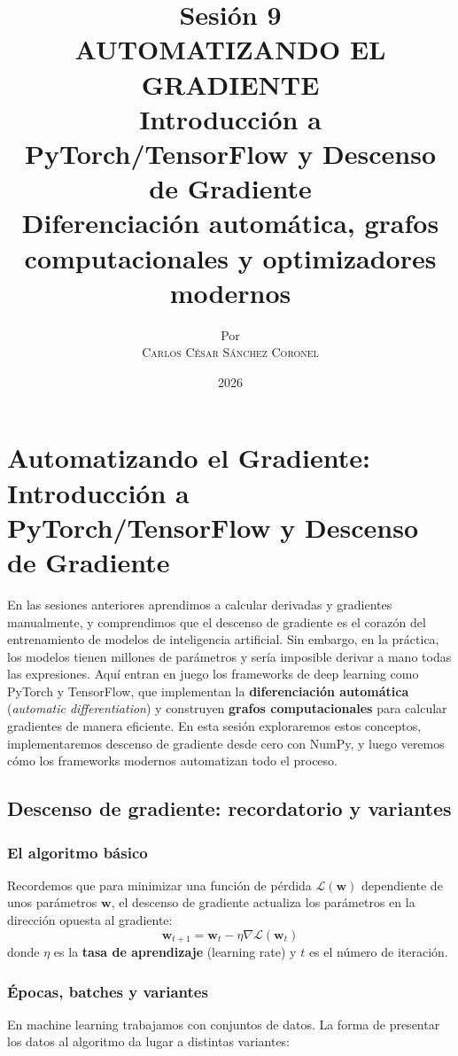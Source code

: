 \documentclass[12pt,a4paper,openany,oneside]{book}
\title{
    \textbf{Sesión 9} \\ 
    \Huge \textbf{AUTOMATIZANDO EL GRADIENTE} \\
    \large Introducción a PyTorch/TensorFlow y Descenso de Gradiente \\
    \normalsize Diferenciación automática, grafos computacionales y optimizadores modernos
}
\author{
    \small Por \\ \vspace{0.2cm}
    \Large \textsc{Carlos César Sánchez Coronel}
}
\date{2026}
\begin{document}
\maketitle
\tableofcontents
{}

\chapter{Automatizando el Gradiente: Introducción a PyTorch/TensorFlow y Descenso de Gradiente}

En las sesiones anteriores aprendimos a calcular derivadas y gradientes manualmente, y comprendimos que el descenso de gradiente es el corazón del entrenamiento de modelos de inteligencia artificial. Sin embargo, en la práctica, los modelos tienen millones de parámetros y sería imposible derivar a mano todas las expresiones. Aquí entran en juego los frameworks de deep learning como PyTorch y TensorFlow, que implementan la \textbf{diferenciación automática} (\textit{automatic differentiation}) y construyen \textbf{grafos computacionales} para calcular gradientes de manera eficiente. En esta sesión exploraremos estos conceptos, implementaremos descenso de gradiente desde cero con NumPy, y luego veremos cómo los frameworks modernos automatizan todo el proceso.

\section{Descenso de gradiente: recordatorio y variantes}

\subsection{El algoritmo básico}
Recordemos que para minimizar una función de pérdida $\mathcal{L}(\mathbf{w})$ dependiente de unos parámetros $\mathbf{w}$, el descenso de gradiente actualiza los parámetros en la dirección opuesta al gradiente:
\[
\mathbf{w}_{t+1} = \mathbf{w}_t - \eta \nabla \mathcal{L}(\mathbf{w}_t)
\]
donde $\eta$ es la \textbf{tasa de aprendizaje} (learning rate) y $t$ es el número de iteración.

\subsection{Épocas, batches y variantes}
En machine learning trabajamos con conjuntos de datos. La forma de presentar los datos al algoritmo da lugar a distintas variantes:
\end{document}
